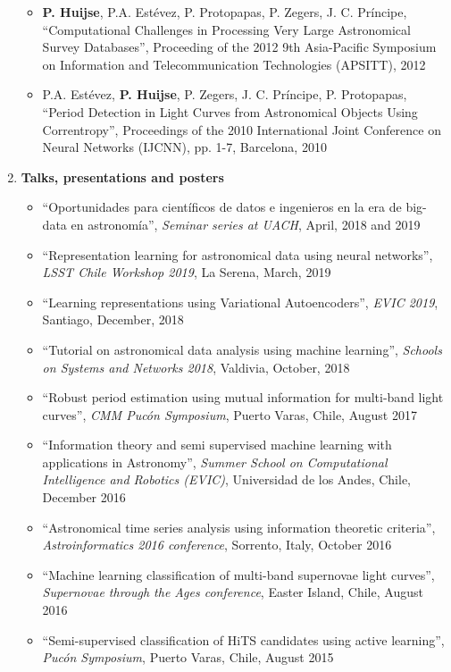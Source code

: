 \documentclass[letterpaper,11pt]{article}
\newcommand{\compactlist}{\setlength{\parskip}{0pt} \setlength{\leftskip}{2em}}
\begin{document}
\begin{enumerate}[I]
\begin{itemize}
        \item \textbf{P. Huijse}, P.A. Estévez, P. Protopapas, P. Zegers, J. C. Príncipe,  ``Computational Challenges in Processing Very Large Astronomical Survey Databases'', Proceeding of the 2012 9th Asia-Pacific Symposium on Information and Telecommunication Technologies (APSITT), 2012
        \item P.A. Estévez, \textbf{P. Huijse}, P. Zegers, J. C. Príncipe, P. Protopapas, ``Period Detection in Light Curves from Astronomical Objects Using Correntropy'', Proceedings of the 2010 International Joint Conference on Neural Networks (IJCNN), pp. 1-7, Barcelona,  2010
	\end{itemize}

    \item \textbf{Talks, presentations and posters}
        \begin{itemize}  \compactlist{}
        \item ``Oportunidades para científicos de datos e ingenieros en la era de big-data en astronomía'', \emph{Seminar series at UACH}, April, 2018 and 2019
        \item ``Representation learning for astronomical data using neural networks'', \emph{LSST Chile Workshop 2019}, La Serena, March, 2019
        \item ``Learning representations using Variational Autoencoders'', \emph{EVIC 2019}, Santiago, December, 2018
        \item ``Tutorial on astronomical data analysis using machine learning'', \emph{Schools on Systems and Networks 2018}, Valdivia, October, 2018
        \item ``Robust period estimation using mutual information for multi-band light curves'', \emph{CMM Pucón Symposium}, Puerto Varas, Chile, August 2017
        \item ``Information theory and semi supervised machine learning with applications in Astronomy'', \emph{Summer School on Computational Intelligence and Robotics (EVIC)}, Universidad de los Andes, Chile, December 2016
        \item ``Astronomical time series analysis using information theoretic criteria'', \emph{Astroinformatics 2016 conference}, Sorrento, Italy, October 2016
        \item ``Machine learning classification of multi-band supernovae light curves'', \emph{Supernovae through the Ages conference}, Easter Island, Chile, August 2016
        \item ``Semi-supervised classification of HiTS candidates using active learning'', \emph{Pucón Symposium}, Puerto Varas, Chile, August 2015

\end{itemize}
\end{enumerate}
\end{document}
